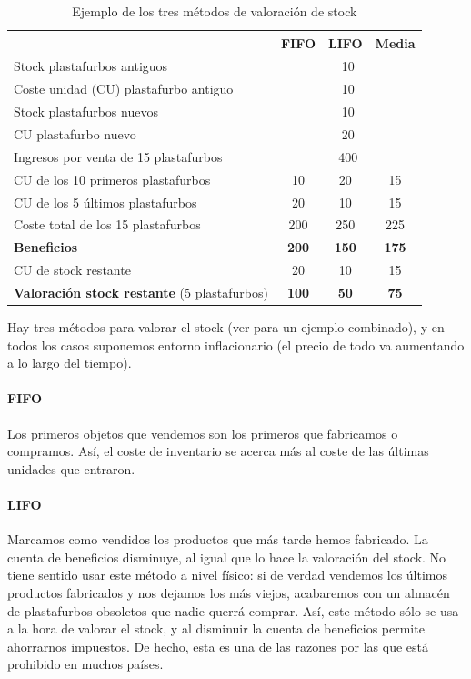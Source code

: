 \documentclass[nochap,palatino,shortheader]{apuntes}
\begin{document}
\begin{table}[hbtp]
\centering
\begin{tabular}{l|c|c|c}
 & \textbf{FIFO} & \textbf{LIFO} & \textbf{Media} \\ \toprule
Stock plastafurbos antiguos & \multicolumn{3}{|c}{10} \\ \midrule
Coste unidad (CU) plastafurbo antiguo & \multicolumn{3}{|c}{10} \\ \midrule
Stock plastafurbos nuevos & \multicolumn{3}{|c}{10} \\ \midrule
CU plastafurbo nuevo & \multicolumn{3}{|c}{20} \\ \midrule
Ingresos por venta de 15 plastafurbos & \multicolumn{3}{|c}{400} \\ \midrule \midrule
CU de los 10 primeros plastafurbos & 10 & 20 & 15 \\ \midrule
CU de los 5 últimos plastafurbos & 20 & 10 & 15 \\ \midrule
Coste total de los 15 plastafurbos & 200 & 250 & 225 \\ \midrule
\textbf{Beneficios} & \textbf{200} & \textbf{150} & \textbf{175} \\ \midrule \midrule
CU de stock restante & 20 & 10 & 15 \\ \midrule
\textbf{Valoración stock restante} (5 plastafurbos) & \textbf{100} & \textbf{50} & \textbf{75} \\ \bottomrule
\end{tabular}
\caption{Ejemplo de los tres métodos de valoración de stock}
\label{tab:ValoracionStock}
\end{table}

Hay tres métodos para valorar el stock (ver  para un ejemplo combinado), y en todos los casos suponemos entorno inflacionario (el precio de todo va aumentando a lo largo del tiempo).

\paragraph{FIFO} Los primeros objetos que vendemos son los primeros que fabricamos o compramos. Así, el coste de inventario se acerca más al coste de las últimas unidades que entraron.

\paragraph{LIFO} Marcamos como vendidos los productos que más tarde hemos fabricado. La cuenta de beneficios disminuye, al igual que lo hace la valoración del stock. No tiene sentido usar este método a nivel físico: si de verdad vendemos los últimos productos fabricados y nos dejamos los más viejos, acabaremos con un almacén de plastafurbos obsoletos que nadie querrá comprar. Así, este método sólo se usa a la hora de valorar el stock, y al disminuir la cuenta de beneficios permite ahorrarnos impuestos. De hecho, esta es una de las razones por las que está prohibido en muchos países.
\end{document}
